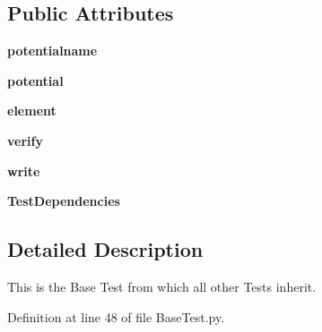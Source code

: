 \subsection*{Public Attributes}
\begin{DoxyCompactItemize}
\item 
\hypertarget{classBaseTest_1_1BaseTest_ab7dc01a5da78c687b1e3ef5695c6bb10}{
{\bfseries potentialname}}
\label{classBaseTest_1_1BaseTest_ab7dc01a5da78c687b1e3ef5695c6bb10}

\item 
\hypertarget{classBaseTest_1_1BaseTest_a0ab2e64475afb484074b0effbab3fbc4}{
{\bfseries potential}}
\label{classBaseTest_1_1BaseTest_a0ab2e64475afb484074b0effbab3fbc4}

\item 
\hypertarget{classBaseTest_1_1BaseTest_a8278580db97a9db5498314f3ea38edb9}{
{\bfseries element}}
\label{classBaseTest_1_1BaseTest_a8278580db97a9db5498314f3ea38edb9}

\item 
\hypertarget{classBaseTest_1_1BaseTest_aa4138cfb9b5dd8906a54427626525971}{
{\bfseries verify}}
\label{classBaseTest_1_1BaseTest_aa4138cfb9b5dd8906a54427626525971}

\item 
\hypertarget{classBaseTest_1_1BaseTest_a709baa7891ff3f65b10303b5bf320f88}{
{\bfseries write}}
\label{classBaseTest_1_1BaseTest_a709baa7891ff3f65b10303b5bf320f88}

\item 
\hypertarget{classBaseTest_1_1BaseTest_a9dc99538651adf4352d5e389221aa646}{
{\bfseries TestDependencies}}
\label{classBaseTest_1_1BaseTest_a9dc99538651adf4352d5e389221aa646}

\end{DoxyCompactItemize}


\subsection{Detailed Description}
\begin{DoxyVerb}This is the Base Test from which all other Tests inherit.\end{DoxyVerb}
 

Definition at line 48 of file BaseTest.py.



